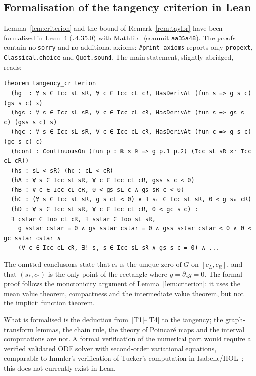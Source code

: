 \documentclass[11pt]{amsart}
\theoremstyle{definition}
\theoremstyle{remark}
\newcommand{\cs}{c_*}
\begin{document}
\subsection{Formalisation of the tangency criterion in Lean}\label{sec:lean}
Lemma~\ref{lem:criterion} and the bound of Remark~\ref{rem:taylor} have been formalised in Lean~4 (v4.35.0)
with Mathlib~\cite{Lean4,mathlib} (commit \texttt{aa35a48}). The proofs contain no \texttt{sorry} and no
additional axioms: \texttt{\#print axioms} reports only \texttt{propext}, \texttt{Classical.choice} and
\texttt{Quot.sound}. The main statement, slightly abridged, reads:
{\footnotesize
\begin{verbatim}
theorem tangency_criterion
  (hg  : ∀ s ∈ Icc sL sR, ∀ c ∈ Icc cL cR, HasDerivAt (fun s => g s c) (gs s c) s)
  (hgs : ∀ s ∈ Icc sL sR, ∀ c ∈ Icc cL cR, HasDerivAt (fun s => gs s c) (gss s c) s)
  (hgc : ∀ s ∈ Icc sL sR, ∀ c ∈ Icc cL cR, HasDerivAt (fun c => g s c) (gc s c) c)
  (hcont : ContinuousOn (fun p : ℝ × ℝ => g p.1 p.2) (Icc sL sR ×ˢ Icc cL cR))
  (hs : sL < sR) (hc : cL < cR)
  (hA : ∀ s ∈ Icc sL sR, ∀ c ∈ Icc cL cR, gss s c < 0)
  (hB : ∀ c ∈ Icc cL cR, 0 < gs sL c ∧ gs sR c < 0)
  (hC : (∀ s ∈ Icc sL sR, g s cL < 0) ∧ ∃ s₀ ∈ Icc sL sR, 0 < g s₀ cR)
  (hD : ∀ s ∈ Icc sL sR, ∀ c ∈ Icc cL cR, 0 < gc s c) :
  ∃ cstar ∈ Ioo cL cR, ∃ sstar ∈ Ioo sL sR,
    g sstar cstar = 0 ∧ gs sstar cstar = 0 ∧ gss sstar cstar < 0 ∧ 0 < gc sstar cstar ∧
    (∀ c ∈ Icc cL cR, ∃! s, s ∈ Icc sL sR ∧ gs s c = 0) ∧ ...
\end{verbatim}
}
\noindent
The omitted conclusions state that $\cs$ is the unique zero of $G$ on $[c_L,c_R]$, and that $(s_*,\cs)$ is the only
point of the rectangle where $g=\partial_sg=0$. The formal proof follows the monotonicity argument of
Lemma~\ref{lem:criterion}: it uses the mean value theorem, compactness and the intermediate value theorem, but
not the implicit function theorem.

What is formalised is the deduction from~\ref{T1}--\ref{T4} to the tangency; the graph-transform lemmas, the
chain rule, the theory of Poincar\'e maps and the interval computations are not. A formal verification of the
numerical part would require a verified validated ODE solver with second-order variational equations,
comparable to Immler's verification of Tucker's computation in Isabelle/HOL~\cite{Immler18}; this does not
currently exist in Lean.
\end{document}
